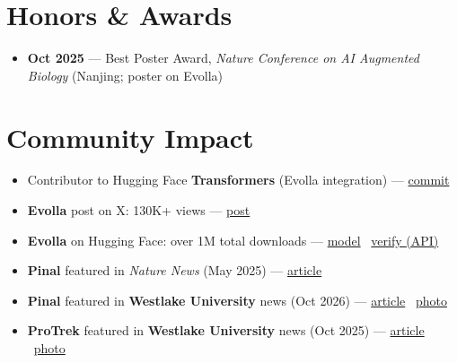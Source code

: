 \documentclass[10pt]{article}
\begin{document}
\section*{Honors \& Awards}
\begin{itemize}
    \item \textbf{Oct 2025} --- Best Poster Award, \textit{Nature Conference on AI Augmented Biology} (Nanjing; poster on Evolla)
\end{itemize}

\section*{Community Impact}
\begin{itemize}
    \item Contributor to Hugging Face \textbf{Transformers} (Evolla integration) --- \href{https://github.com/huggingface/transformers/commit/45c7bfb1571160d2c06b880073a5c73e6bfa3677}{commit}
    \item \textbf{Evolla} post on X: 130K+ views --- \href{https://x.com/duguyuan/status/1876446845951492221}{post}
    \item \textbf{Evolla} on Hugging Face: over 1M total downloads --- \href{https://huggingface.co/westlake-repl/Evolla-10B-hf}{model} \textbar\ \href{https://huggingface.co/api/models/westlake-repl/Evolla-10B-hf?expand\%5B\%5D=downloadsAllTime}{verify (API)}
    \item \textbf{Pinal} featured in \textit{Nature News} (May 2025) --- \href{https://www.nature.com/articles/d41586-025-01586-y}{article}
    \item \textbf{Pinal} featured in \textbf{Westlake University} news (Oct 2026) --- \href{https://www.westlake.edu.cn/news_events/westlakenews/Research/202610/t20261022_70597.html}{article} \textbar\ \href{https://zhoubay.github.io/files/evidence/westlake-press-pinal.png}{photo}
    \item \textbf{ProTrek} featured in \textbf{Westlake University} news (Oct 2025) --- \href{https://www.westlake.edu.cn/news_events/westlakenews/Research/202510/t20251030_60873.html}{article} \textbar\ \href{https://zhoubay.github.io/files/evidence/westlake-press.jpg}{photo}
\end{itemize}
\end{document}
